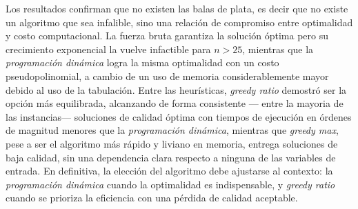 Los resultados confirman que no existen las balas de plata, es decir que no existe un algoritmo que sea infalible, sino una relación de compromiso entre optimalidad y costo computacional. La fuerza bruta garantiza la solución óptima pero su crecimiento exponencial la vuelve infactible para $n > 25$, mientras que la \textit{programación dinámica} logra la misma optimalidad con un costo pseudopolinomial, a cambio de un uso de memoria considerablemente mayor debido al uso de la tabulación. Entre las heurísticas, \textit{greedy ratio} demostró ser la opción más equilibrada, alcanzando de forma consistente --- entre la mayoria de las instancias--- soluciones de calidad óptima con tiempos de ejecución en órdenes de magnitud menores que la \textit{programación dinámica}, mientras que \textit{greedy max}, pese a ser el algoritmo más rápido y liviano en memoria, entrega soluciones de baja calidad, sin una dependencia clara respecto a ninguna de las variables de entrada. En definitiva, la elección del algoritmo debe ajustarse al contexto: la \textit{programación dinámica} cuando la optimalidad es indispensable, y \textit{greedy ratio} cuando se prioriza la eficiencia con una pérdida de calidad aceptable.